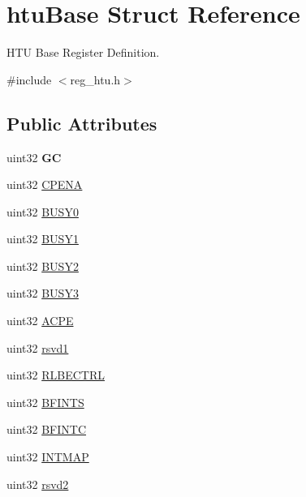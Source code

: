 \hypertarget{structhtuBase}{}\section{htu\+Base Struct Reference}
\label{structhtuBase}


H\+TU Base Register Definition.  




{\ttfamily \#include $<$reg\+\_\+htu.\+h$>$}

\subsection*{Public Attributes}
\begin{DoxyCompactItemize}
\item 
\mbox{\label{structhtuBase_a3ff5b3c6965508d0dd87a0026c5a2321}} 
uint32 {\bfseries GC}
\item 
uint32 \mbox{\hyperlink{structhtuBase_a5f4de2671fa5ee5db40a31bd4f741b8e}{C\+P\+E\+NA}}
\item 
uint32 \mbox{\hyperlink{structhtuBase_adcf411f065196fd7668f4baec3bcbb7c}{B\+U\+S\+Y0}}
\item 
uint32 \mbox{\hyperlink{structhtuBase_abf5eecfd69fb2c6e697c5c6c549c84f6}{B\+U\+S\+Y1}}
\item 
uint32 \mbox{\hyperlink{structhtuBase_ab9f0f71f9987d2c1cf8b72c2747622ce}{B\+U\+S\+Y2}}
\item 
uint32 \mbox{\hyperlink{structhtuBase_a5625e13ecca50ca67a204836754f3585}{B\+U\+S\+Y3}}
\item 
uint32 \mbox{\hyperlink{structhtuBase_a723deeb1537ff4e08633bc6f24aab215}{A\+C\+PE}}
\item 
uint32 \mbox{\hyperlink{structhtuBase_af98febad161a62a137c4538ff0af83c3}{rsvd1}}
\item 
uint32 \mbox{\hyperlink{structhtuBase_adbe91195ece93ac614fc02c7f74f1612}{R\+L\+B\+E\+C\+T\+RL}}
\item 
uint32 \mbox{\hyperlink{structhtuBase_a44a6df8c1eef25dfc567c509b06e787d}{B\+F\+I\+N\+TS}}
\item 
uint32 \mbox{\hyperlink{structhtuBase_adaae739662971a8b2263a4452cad2fc4}{B\+F\+I\+N\+TC}}
\item 
uint32 \mbox{\hyperlink{structhtuBase_a8dc96b1f64f48f5e9ef52f5573494b63}{I\+N\+T\+M\+AP}}
\item 
uint32 \mbox{\hyperlink{structhtuBase_a9757b6c8fd40c0d4d0d42954d0632bf2}{rsvd2}}
\item 

\end{DoxyCompactItemize}
